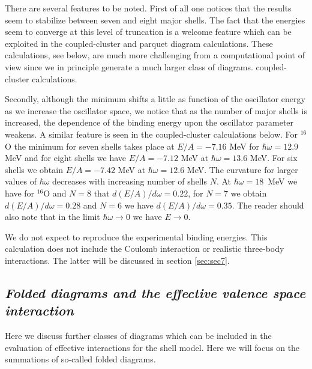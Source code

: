\documentclass{article}
\begin{document}
There are several features to be noted. First of all one notices that the results 
seem to stabilize between seven and eight  
major shells. 
The fact that the energies seem to converge at this level of truncation is a welcome
feature which can be exploited in the coupled-cluster and parquet diagram 
calculations. These calculations,
see below, are much more challenging from a computational point of view since we in principle
generate a much larger class of diagrams. 
coupled-cluster calculations. 

Secondly, although the minimum shifts a little 
as function of the oscillator energy as we increase the
oscillator space, we notice
that as the number of major shells is increased, the 
dependence of the binding energy 
upon the oscillator parameter weakens. A similar 
feature is seen in the coupled-cluster calculations
below.  
For $^{16}$O the minimum for seven shells 
takes place at $E/A=-7.16$ MeV for $\hbar\omega = 12.9$ MeV 
and for eight shells we have   $E/A=-7.12$ MeV at $\hbar\omega = 13.6$ MeV. For six shells
we obtain  $E/A=-7.42$ MeV at $\hbar\omega = 12.6$ MeV. 
The curvature for larger values of $\hbar\omega$ decreases with increasing number of shells $N$.
At $\hbar\omega =18$~MeV we have for $^{16}$O and $N=8$ that $d(E/A)/d\omega=0.22$, for 
$N=7$ we obtain $d(E/A)/d\omega=0.28$
and $N=6$ we have $d(E/A)/d\omega=0.35$. 
The reader should also note that 
in the limit $\hbar\omega \rightarrow 0$ we have
$E\rightarrow 0$.  

We do not expect to reproduce the experimental binding energies. This calculation
does not include the Coulomb interaction or realistic three-body interactions.
The latter will be discussed in section \ref{sec:sec7}.


\subsection{\it Folded diagrams and the effective valence space interaction}

Here we discuss further classes of diagrams
which can be included in the evaluation of effective interactions
for the shell model.
Here we will focus on the summations of so-called folded
diagrams.
\end{document}
